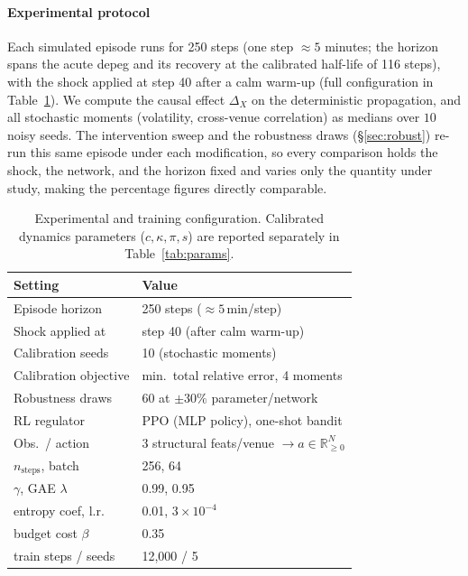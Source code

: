 \documentclass[sigconf,anonymous]{acmart}
\begin{document}
\paragraph{Experimental protocol} Each simulated episode runs for 250 steps (one step
$\approx5$ minutes; the horizon spans the acute depeg and its recovery at the calibrated
half-life of 116 steps), with the shock applied at step
40 after a calm warm-up (full configuration in Table~\ref{tab:config}). We compute the causal effect $\Delta_X$ on the deterministic propagation, and
all stochastic moments (volatility, cross-venue correlation) as medians over $10$ noisy seeds. The
intervention sweep and the robustness draws (\S\ref{sec:robust}) re-run this same episode under each
modification, so every comparison holds the shock, the network, and the horizon fixed and varies only
the quantity under study, making the percentage figures directly comparable.

\begin{table}[t]
\caption{Experimental and training configuration. Calibrated dynamics parameters
($c,\kappa,\pi,s$) are reported separately in Table~\ref{tab:params}.}
\label{tab:config}
\small
\setlength{\tabcolsep}{4.5pt}
\begin{tabular}{ll}
\toprule
Setting & Value \\
\midrule
Episode horizon & 250 steps ($\approx5$\,min/step) \\
Shock applied at & step 40 (after calm warm-up) \\
Calibration seeds & 10 (stochastic moments) \\
Calibration objective & min.\ total relative error, 4 moments \\
Robustness draws & 60 at $\pm30\%$ parameter/network \\
\midrule
RL regulator & PPO (MLP policy), one-shot bandit \\
Obs.\ / action & 3 structural feats/venue $\to a\in\mathbb{R}^N_{\ge0}$ \\
$n_{\text{steps}}$, batch & 256, 64 \\
$\gamma$, GAE $\lambda$ & 0.99, 0.95 \\
entropy coef, l.r.\ & 0.01, $3\times10^{-4}$ \\
budget cost $\beta$ & 0.35 \\
train steps / seeds & 12{,}000 / 5 \\
\bottomrule
\end{tabular}
\end{table}
\end{document}
